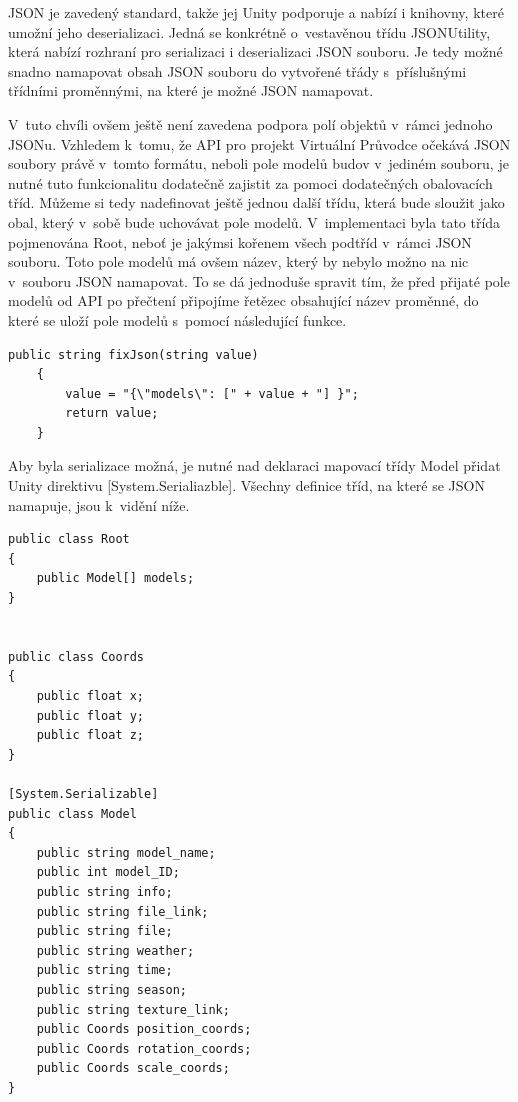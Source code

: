 \documentclass[thesis=B,czech]{FITthesis}[2012/06/26]
\begin{document}
	 JSON je zavedený standard, takže jej Unity podporuje a nabízí i knihovny, které umožní jeho deserializaci. Jedná se konkrétně o~vestavěnou třídu JSONUtility, která nabízí rozhraní pro serializaci i deserializaci JSON souboru. Je tedy možné snadno namapovat obsah JSON souboru do vytvořené třády s~příslušnými třídními proměnnými, na které je možné JSON namapovat. \cite{UnityJSON}

V~tuto chvíli ovšem ještě není zavedena podpora polí objektů v~rámci jednoho JSONu. \cite{UnityJSON} Vzhledem k~tomu, že API pro projekt Virtuální Průvodce očekává JSON soubory právě v~tomto formátu, neboli pole modelů budov v~jediném souboru, je nutné tuto funkcionalitu dodatečně zajistit za pomoci dodatečných obalovacích tříd. Můžeme si tedy nadefinovat ještě jednou další třídu, která bude sloužit jako obal, který v~sobě bude uchovávat pole modelů. V~implementaci byla tato třída pojmenována Root, neboť je jakýmsi kořenem všech podtříd v~rámci JSON souboru. Toto pole modelů má ovšem název, který by nebylo možno na nic v~souboru JSON namapovat. To se dá jednoduše spravit tím, že před přijaté pole modelů od API po přečtení připojíme řetězec obsahující název proměnné, do které se uloží pole modelů s~pomocí následující funkce.

\begin{minipage}[c]{0.95\textwidth}
\begin{lstlisting}[frame=single]
public string fixJson(string value)
    {
        value = "{\"models\": [" + value + "] }";
        return value;
    }

\end{lstlisting}
\end{minipage}

Aby byla serializace možná, je nutné nad deklaraci mapovací třídy Model přidat Unity direktivu [System.Serialiazble]. Všechny definice tříd, na které se JSON namapuje, jsou k~vidění níže. 

\begin{minipage}[c]{0.95\textwidth}
\begin{lstlisting}[frame=single]
public class Root
{
    public Model[] models;
}


public class Coords 
{
    public float x;
    public float y;
    public float z;
}

[System.Serializable]
public class Model
{
    public string model_name;
    public int model_ID;
    public string info;
    public string file_link;
    public string file;
    public string weather;
    public string time;
    public string season;
    public string texture_link;
    public Coords position_coords;
    public Coords rotation_coords;
    public Coords scale_coords;
}
\end{lstlisting}
\end{minipage}
\end{document}
